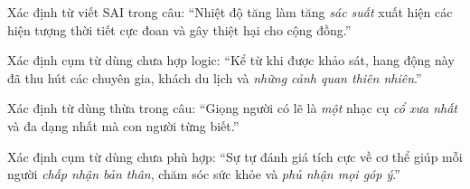 \begin{ex}
Xác định từ viết SAI trong câu: “Nhiệt độ tăng làm tăng \textit{sác suất} xuất hiện các hiện tượng thời tiết cực đoan và gây thiệt hại cho cộng đồng.”
\end{ex}

\begin{ex}
Xác định cụm từ dùng chưa hợp logic: “Kể từ khi được khảo sát, hang động này đã thu hút các chuyên gia, khách du lịch và \textit{những cảnh quan thiên nhiên}.”
\end{ex}

\begin{ex}
Xác định từ dùng thừa trong câu: “Giọng người có lẽ là \textit{một} nhạc cụ \textit{cổ xưa nhất} và đa dạng nhất mà con người từng biết.”
\end{ex}

\begin{ex}
Xác định cụm từ dùng chưa phù hợp: “Sự tự đánh giá tích cực về cơ thể giúp mỗi người \textit{chấp nhận bản thân}, chăm sóc sức khỏe và \textit{phủ nhận mọi góp ý}.”
\end{ex}


